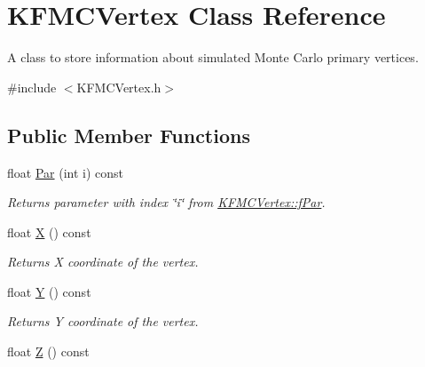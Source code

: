 \hypertarget{classKFMCVertex}{}\section{K\+F\+M\+C\+Vertex Class Reference}
\label{classKFMCVertex}


A class to store information about simulated Monte Carlo primary vertices.  




{\ttfamily \#include $<$K\+F\+M\+C\+Vertex.\+h$>$}

\subsection*{Public Member Functions}
\begin{DoxyCompactItemize}
\item 
float \hyperlink{classKFMCVertex_a3081f0e8c418770c5ea288a204638af3}{Par} (int i) const \hypertarget{classKFMCVertex_a3081f0e8c418770c5ea288a204638af3}{}\label{classKFMCVertex_a3081f0e8c418770c5ea288a204638af3}

\begin{DoxyCompactList}\small\item\em Returns parameter with index \char`\"{}i\char`\"{} from \hyperlink{classKFMCVertex_a647ebd7994aa422d5455a3f66d9bbff9}{K\+F\+M\+C\+Vertex\+::f\+Par}. \end{DoxyCompactList}\item 
float \hyperlink{classKFMCVertex_afd80435d29bb37bcbb5a9de88d1a89e4}{X} () const \hypertarget{classKFMCVertex_afd80435d29bb37bcbb5a9de88d1a89e4}{}\label{classKFMCVertex_afd80435d29bb37bcbb5a9de88d1a89e4}

\begin{DoxyCompactList}\small\item\em Returns X coordinate of the vertex. \end{DoxyCompactList}\item 
float \hyperlink{classKFMCVertex_abf64836dc4f3b0e88c95e5767c908c17}{Y} () const \hypertarget{classKFMCVertex_abf64836dc4f3b0e88c95e5767c908c17}{}\label{classKFMCVertex_abf64836dc4f3b0e88c95e5767c908c17}

\begin{DoxyCompactList}\small\item\em Returns Y coordinate of the vertex. \end{DoxyCompactList}\item 
float \hyperlink{classKFMCVertex_a4f4608d79cd24afa303f8bc952e02748}{Z} () const \hypertarget{classKFMCVertex_a4f4608d79cd24afa303f8bc952e02748}{}\label{classKFMCVertex_a4f4608d79cd24afa303f8bc952e02748}


\end{DoxyCompactItemize}
